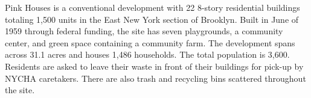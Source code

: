  

Pink Houses is a conventional development with 22 8-story residential buildings totaling 1,500 units in the East New York section of Brooklyn. Built in June of 1959 through federal funding, the site has seven playgrounds, a community center, and green space containing a community farm. The development spans across 31.1 acres and houses 1,486 households. The total population is 3,600. Residents are asked to leave their waste in front of their buildings for pick-up by NYCHA caretakers. There are also trash and recycling bins scattered throughout the site. 